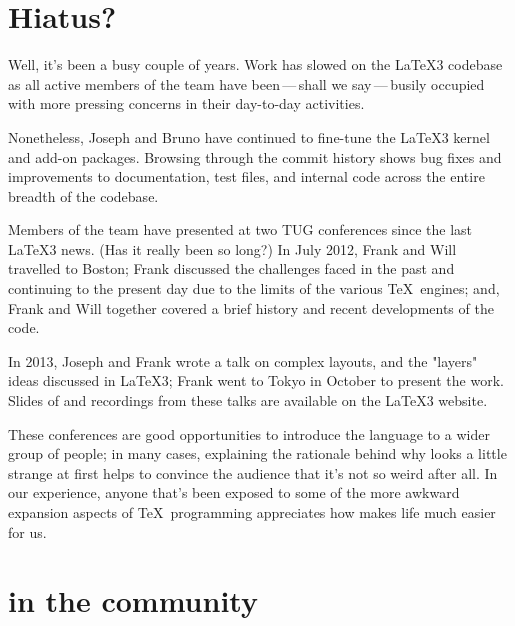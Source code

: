 \documentclass{ltnews}
\def\Dash{\,---\,}
\begin{document}
\maketitle

\raisefirstsection

\tableofcontents     %

\section{Hiatus?}

Well, it's been a busy couple of years.
Work has slowed on the \LaTeX3 codebase as all active members of the team have been\Dash shall we say\Dash busily occupied with more pressing concerns in their day-to-day activities.

Nonetheless, Joseph and Bruno have continued to fine-tune the \LaTeX3 kernel and add-on packages.
Browsing through the commit history shows bug fixes and improvements to documentation, test files, and internal code across the entire breadth of the codebase.

Members of the team have presented at two TUG conferences since the last \LaTeX3 news. (Has it really been so long?)
In July 2012, Frank and Will travelled to Boston; Frank discussed the challenges faced in the past and continuing to the present day due to the limits of the various \TeX\ engines; and, Frank and Will together covered a brief history and recent developments of the  code.

In 2013, Joseph and Frank wrote a talk on complex layouts, and the "layers" ideas discussed in \LaTeX3; Frank went to Tokyo in October to present the work.
Slides of and recordings from these talks are available on the \LaTeX3 website.

These conferences are good opportunities to introduce the  language to a wider group of people; in many cases, explaining the rationale behind why  looks a little strange at first helps to convince the audience that it's not so weird after all.
In our experience, anyone that's been exposed to some of the more awkward expansion aspects of \TeX\ programming appreciates how  makes life much easier for us.

\section{ in the community}
\end{document}
